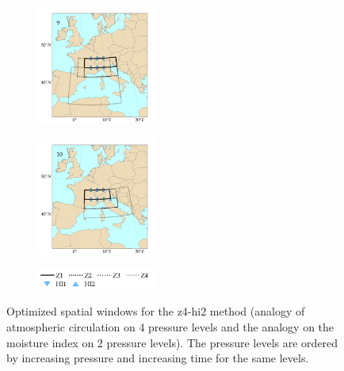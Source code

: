 \documentclass[twocol]{ametsoc}
\begin{document}
\begin{figure}[htb]
\begin{subfigure}{.5\columnwidth}
		\centering
		\includegraphics[width=3.9cm]{figures/spatial_win_z4-hi2/Spatial_windows_9.png}
	\end{subfigure}%
	\begin{subfigure}{.5\columnwidth}
		\centering
		\includegraphics[width=3.9cm]{figures/spatial_win_z4-hi2/Spatial_windows_10.png}
	\end{subfigure}
	\begin{subfigure}{.5\columnwidth}
		\centering
		\includegraphics[width=3.9cm]{figures/spatial_win_z4-hi2/legend.png}
	\end{subfigure}
	\caption{Optimized spatial windows for the z4-hi2 method (analogy of atmospheric circulation on 4 pressure levels and the analogy on the moisture index on 2 pressure levels). The pressure levels are ordered by increasing pressure and increasing time for the same levels.}
	\label{fig:spatial_windows_z4-hi2}
\end{figure}
\end{document}
